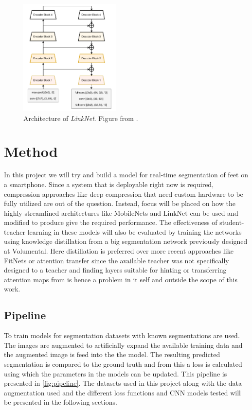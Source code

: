 \documentclass{kththesis}
\begin{document}
\begin{figure}[h]
  \centering
  \includegraphics[width=0.45\textwidth]{LinkNet}
  \caption{Architecture of \textit{LinkNet}. Figure from \textcite{chaurasia2017linknet}.}
  \label{fig:LinkNet}
\end{figure}


\chapter{Method} \label{chap:method}

In this project we will try and build a model for real-time segmentation of feet
on a smartphone. Since a system that is deployable right now is required,
compression approaches like deep compression that need custom hardware to be
fully utilized are out of the question. Instead, focus will be placed on how
the highly streamlined architectures like MobileNets and LinkNet can be used and
modified to produce give the required performance. The effectiveness of
student-teacher learning in these models will also be evaluated by training the
networks using knowledge distillation from a big segmentation network previously
designed at Volumental. Here distillation is preferred over more recent
approaches like FitNets or attention transfer since the available teacher was
not specifically designed to a teacher and finding layers suitable for hinting or
transferring attention maps from is hence a problem in it self and outside the
scope of this work.

\section{Pipeline}
To train models for segmentation datasets with known segmentations are used. The
images are augmented to artificially expand the available training data and the
augmented image is feed into the the model. The resulting predicted segmentation
is compared to the ground truth and from this a loss is calculated using which
the parameters in the models can be updated. This pipeline is presented in
\cref{fig:pipeline}. The datasets used in this project along with the data
augmentation used and the different loss functions and CNN models tested will be
presented in the following sections.
\end{document}
